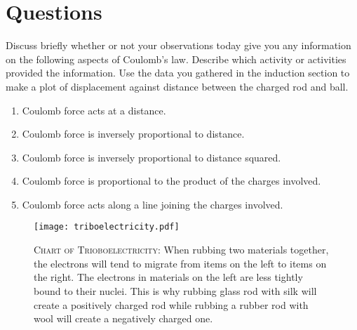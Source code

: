 \newpage
\section{Questions}

Discuss briefly whether or not your observations today give you any information on the following aspects of Coulomb's law.  Describe which activity or activities provided the information. Use the data you gathered in the induction section to make a plot of displacement against distance between the charged rod and ball.
\begin{enumerate}
	\item Coulomb force acts at a distance.
	\item Coulomb force is inversely proportional to distance.
	\item Coulomb force is inversely proportional to distance squared.
	\item Coulomb force is proportional to the product of the charges involved.
	\item Coulomb force acts along a line joining the charges involved.
\end{enumerate}

\vfill
\begin{figure*}
	\centering
	\texttt{[image: triboelectricity.pdf]}
	\caption[Chart of Triboelectricity]{\textsc{Chart of Trioboelectricity}: When rubbing two materials together, the electrons will tend to migrate from items on the left to items on the right.  The electrons in materials on the left are less tightly bound to their nuclei.  This is why rubbing glass rod with silk will create a positively charged rod while rubbing a rubber rod with wool will create a negatively charged one.}
\end{figure*}
\endinput